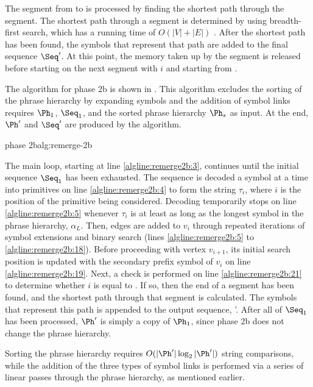 The segment from  to  is processed by finding the
shortest path through the segment.
The shortest path through a segment is determined by using 
breadth-first search, 
which has a running time of $O(|V| + |E|)$ \citep{clrs01:book}.
After the shortest path
has been found, the symbols that represent that path are
added to the final sequence $\Seq'$.  At this
point, the memory taken up by the segment is released
before starting on the next segment with $i$ and 
starting from .


The algorithm for phase 2b is shown 
in .  This algorithm excludes the sorting 
of the phrase
hierarchy by expanding symbols and the addition of symbol links
 requires $\Ph_1$, $\Seq_1$, and the sorted
phrase hierarchy $\Ph_s$ as input.  At the end, $\Ph'$ and $\Seq'$
are produced by the algorithm.

{\remerge phase 2b}{alg:remerge-2b}

The main loop, starting at line \ref{algline:remerge2b:3},
continues until the initial sequence $\Seq_1$ has
been exhausted.  The sequence is decoded a symbol at a time
into primitives on line \ref{algline:remerge2b:4} to form
the string $\tau_i$, where $i$ is the position of the primitive
being considered.  Decoding temporarily stops on line 
\ref{algline:remerge2b:5} whenever $\tau_i$ is at least as
long as the longest symbol in the phrase hierarchy, 
$\alpha_L$.  Then, edges are added to $v_i$ through repeated
iterations of symbol extensions and binary search 
(lines \ref{algline:remerge2b:5} to 
\ref{algline:remerge2b:18}).
Before proceeding with vertex $v_{i+1}$, its initial search
position is updated with the secondary prefix symbol of $v_i$
on line \ref{algline:remerge2b:19}.  
Next, a check is performed on
line \ref{algline:remerge2b:21} to determine whether 
$i$ is equal to .  If so,
then the end of a segment has been found, and the shortest path
through that segment is calculated.  The symbols that represent
this path is appended to the output sequence, \Seq'.  After all
of $\Seq_1$ has been processed, $\Ph'$ is simply a copy of $\Ph_1$,
since phase 2b does not change the phrase hierarchy.

Sorting the phrase hierarchy requires 
$O(|\Ph'|\log_2 |\Ph'|)$ string comparisons, while the
addition of the three types of symbol links 
is performed via a series of linear passes through the phrase
hierarchy, as mentioned earlier.

